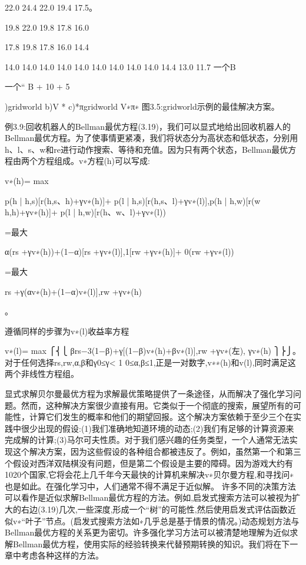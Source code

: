 22.0 24.4 22.0 19.4 17.5。


19.8 22.0 19.8 17.8 16.0


17.8 19.8 17.8 16.0 14.4


14.0 14.0 14.0 14.0 14.0 14.0 14.0 14.0 14.0 14.4 13.0 11.7
一个B




一个“
B + 10
+ 5


)gridworld b)V * c)*πgridworld V∗π∗
图3.5:gridworld示例的最佳解决方案。


例3.9:回收机器人的Bellman最优方程(3.19)，我们可以显式地给出回收机器人的Bellman最优方程。为了使事情更紧凑，我们将状态分为高状态和低状态，分别用h、l、s、w和re进行动作搜索、等待和充值。因为只有两个状态，Bellman最优方程由两个方程组成。v∗方程(h)可以写成:

v∗(h)= max

p(h | h,s)[r(h,s、h)+γv∗(h)]+ p(l | h,s)[r(h,s、l)+γv∗(l)],p(h | h,w)[r(w h,h)+γv∗(h)]+ p(l | h,w)[r(h、w、l)+γv∗(l))

=最大

α(rs +γv∗(h))+(1−α)[rs +γv∗(l)],1[rw +γv∗(h)]+ 0(rw +γv∗(l))

=最大

rs +γ(αv∗(h)+(1−α)v∗(l)],rw +γv∗(h)

。

遵循同样的步骤为v∗(l)收益率方程


v∗(l)= max
⎧⎨⎩
βrs−3(1−β)+γ[(1−β)v∗(h)+βv∗(l)],rw +γv∗(左),
γv∗(h)
⎫⎬⎭。
对于任何选择rs,rw,α,β和γ0≤γ< 1 0≤α,β≤1,正是一对数字,v∗∗(h)和v(l),同时满足这两个非线性方程组。

显式求解贝尔曼最优方程为求解最优策略提供了一条途径，从而解决了强化学习问题。然而，这种解决方案很少直接有用。它类似于一个彻底的搜索，展望所有的可能性，计算它们发生的概率和他们的期望回报。这个解决方案依赖于至少三个在实践中很少出现的假设:(1)我们准确地知道环境的动态;(2)我们有足够的计算资源来完成解的计算;(3)马尔可夫性质。对于我们感兴趣的任务类型，一个人通常无法实现这个解决方案，因为这些假设的各种组合都被违反了。例如，虽然第一个和第三个假设对西洋双陆棋没有问题，但是第二个假设是主要的障碍。因为游戏大约有1020个国家,它将会花上几千年今天最快的计算机来解决v∗贝尔曼方程,和寻找问∗也是如此。在强化学习中，人们通常不得不满足于近似解。
许多不同的决策方法可以看作是近似求解Bellman最优方程的方法。例如,启发式搜索方法可以被视为扩大的右边(3.19)几次,一些深度,形成一个“树”的可能性,然后使用启发式评估函数近似v∗“叶子”节点。(启发式搜索方法如∗几乎总是基于情景的情况。)动态规划方法与Bellman最优方程的关系更为密切。许多强化学习方法可以被清楚地理解为近似求解Bellman最优方程，使用实际的经验转换来代替预期转换的知识。我们将在下一章中考虑各种这样的方法。


